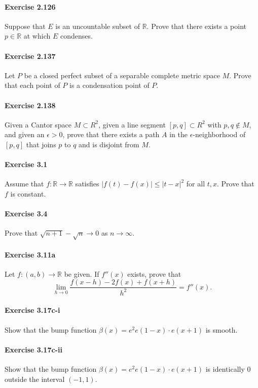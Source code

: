 \documentclass{article}
\begin{document}
\paragraph{Exercise 2.126} Suppose that $E$ is an uncountable subset of $\mathbb{R}$. Prove that there exists a point $p \in \mathbb{R}$ at which $E$ condenses.

\paragraph{Exercise 2.137} Let $P$ be a closed perfect subset of a separable complete metric space $M$. Prove that each point of $P$ is a condensation point of $P$.

\paragraph{Exercise 2.138} Given a Cantor space $M \subset R^2$, given a line segment $[p, q] \subset R^2$ with $p, q \not\in M$, and given an $\epsilon > 0$, prove that there exists a path $A$ in the $\epsilon$-neighborhood of $[p, q]$ that joins $p$ to $q$ and is disjoint from $M$.

\paragraph{Exercise 3.1} Assume that $f \colon \mathbb{R} \rightarrow \mathbb{R}$ satisfies $|f(t)-f(x)| \leq|t-x|^{2}$ for all $t, x$. Prove that $f$ is constant.

\paragraph{Exercise 3.4} Prove that $\sqrt{n+1}-\sqrt{n} \rightarrow 0$ as $n \rightarrow \infty$.

\paragraph{Exercise 3.11a} Let $f \colon (a, b) \rightarrow \mathbb{R}$ be given.  If $f''(x)$ exists, prove that \[\lim_{h \rightarrow 0} \frac{f(x - h) - 2f(x) + f(x + h)}{h^2} = f''(x).\]

\paragraph{Exercise 3.17c-i} Show that the bump function $\beta(x)=e^{2} e(1-x) \cdot e(x+1)$ is smooth.

\paragraph{Exercise 3.17c-ii} Show that the bump function $\beta(x)=e^{2} e(1-x) \cdot e(x+1)$ is identically 0 outside the interval $(-1, 1)$.
\end{document}
